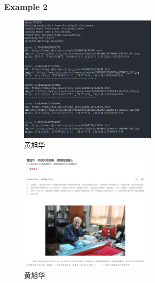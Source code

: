 \documentclass[12pt,a4paper]{article}
\begin{document}
\subsubsection{Example 2}
\begin{figure}[H]
	\includegraphics[width=0.6\textwidth]{q40.png}
	\centering
	 \caption{黄旭华}
\end{figure}
\begin{figure}[H]
	\includegraphics[width=0.6\textwidth]{q41.png}
	\centering
	 \caption{黄旭华}
\end{figure}
\end{document}
